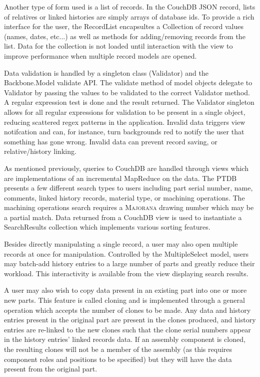 \documentclass[journal]{IEEEtran}
\begin{document}
Another type of form used is a list of records. 
In the CouchDB JSON record, lists of relatives or linked histories are simply arrays of database ids. To provide a rich
interface for the user, the RecordList encapsultes a Collection of record values (names, dates, etc...)
as well as methods for adding/removing records from the list. Data for the collection is not loaded
until interaction with the view to improve performance when multiple record models are opened.

Data validation is handled by a singleton class (Validator) and the Backbone.Model validate API. The validate
method of model objects delegate to Validator by passing the values to be validated to the correct
Validator method. A regular expression test is done and the result returned. The Validator singleton
allows for all regular expressions for validation to be present in a single object, reducing scattered
regex patterns in the application. Invalid data triggers view notifcation and can, for instance, turn backgrounds 
red to notify the user that something has gone wrong. Invalid data can prevent record saving, or relative/history linking.

As mentioned previously, queries to CouchDB are handled through views which are implementations of an
incremental MapReduce on the data. The PTDB presents a few different search types to users including
part serial number, name, comments, linked history records, material type, or machining operations.
The machining operations search requires a \textsc{Majorana} drawing number which may be a partial match. Data
returned from a CouchDB view is used to instantiate a SearchResults collection which implements various
sorting features.

Besides directly manipulating a single record, a user may also open multiple records at once for 
manipulation. Controlled by the MultipleSelect model, users may batch-add history entries to a
large number of parts and greatly reduce their workload. This interactivity is available from
the view displaying search results.

A user may also wish to copy data present in an existing part into one or more new parts. This
feature is called cloning and is implemented through a general operation which accepts the number
of clones to be made. Any data and history entries present in the original part are present in the
clones produced, and history entries are re-linked to the new clones such that the clone serial
numbers appear in the history entries' linked records data. If an assembly component is cloned, the
resulting clones will not be a member of the assembly (as this requires component roles and positions
to be specified) but they will have the data present from the original part.
\end{document}
